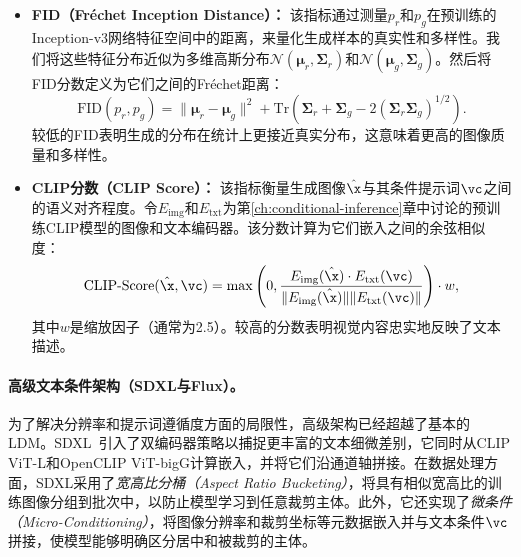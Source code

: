\documentclass[../../book-main_zh.tex]{subfiles}
\begin{document}
\begin{itemize}
    \item \textbf{FID（Fréchet Inception Distance）：} 该指标通过测量$p_r$和$p_g$在预训练的Inception-v3网络特征空间中的距离，来量化生成样本的真实性和多样性。我们将这些特征分布近似为多维高斯分布$\mathcal{N}(\bm{\mu}_r, \bm{\Sigma}_r)$和$\mathcal{N}(\bm{\mu}_g, \bm{\Sigma}_g)$。然后将FID分数定义为它们之间的Fréchet距离：
    \begin{equation}
        \text{FID}(p_r, p_g) = \| \bm{\mu}_r - \bm{\mu}_g \|^2 + \text{Tr}\left( \bm{\Sigma}_r + \bm{\Sigma}_g - 2(\bm{\Sigma}_r \bm{\Sigma}_g)^{1/2} \right).
    \end{equation}
    较低的FID表明生成的分布在统计上更接近真实分布，这意味着更高的图像质量和多样性。

    \item \textbf{CLIP分数（CLIP Score）：} 该指标衡量生成图像$\hat{\x}$与其条件提示词$\vc$之间的语义对齐程度。令$E_{\text{img}}$和$E_{\text{txt}}$为第\ref{ch:conditional-inference}章中讨论的预训练CLIP模型的图像和文本编码器。该分数计算为它们嵌入之间的余弦相似度：
    \begin{equation}
        \text{CLIP-Score}(\hat{\x}, \vc) = \max \left( 0, \frac{E_{\text{img}}(\hat{\x}) \cdot E_{\text{txt}}(\vc)}{\|E_{\text{img}}(\hat{\x})\| \|E_{\text{txt}}(\vc)\|} \right) \cdot w,
    \end{equation}
    其中$w$是缩放因子（通常为2.5）。较高的分数表明视觉内容忠实地反映了文本描述。
\end{itemize}

\paragraph{高级文本条件架构（SDXL与Flux）。}
为了解决分辨率和提示词遵循度方面的局限性，高级架构已经超越了基本的LDM。SDXL~\citep{podell2023sdxl}引入了双编码器策略以捕捉更丰富的文本细微差别，它同时从CLIP ViT-L和OpenCLIP ViT-bigG计算嵌入，并将它们沿通道轴拼接。在数据处理方面，SDXL采用了\textit{宽高比分桶（Aspect Ratio Bucketing）}，将具有相似宽高比的训练图像分组到批次中，以防止模型学习到任意裁剪主体。此外，它还实现了\textit{微条件（Micro-Conditioning）}，将图像分辨率和裁剪坐标等元数据嵌入并与文本条件$\vc$拼接，使模型能够明确区分居中和被裁剪的主体。
\end{document}
